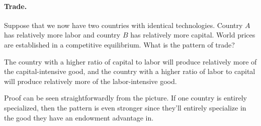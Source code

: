 \documentclass[10pt]{article}
\begin{document}
\paragraph{Trade.} Suppose that we now have two countries with identical technologies. Country $A$ has relatively more labor and country $B$ has relatively more capital. World prices are established in a competitive equilibrium. What is the pattern of trade?

\begin{theorem}
	 The country with a higher ratio of capital to labor will produce relatively more of the capital-intensive good, and the country with a higher ratio of labor to capital will produce relatively more of the labor-intensive good.
\end{theorem}

Proof can be seen straightforwardly from the picture. If one country is entirely specialized, then the pattern is even stronger since they'll entirely specialize in the good they have an endowment advantage in.
\end{document}
